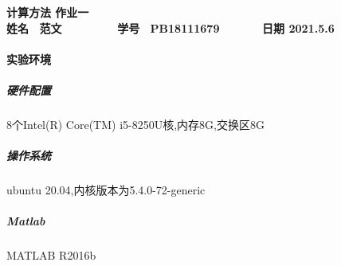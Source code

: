 \documentclass[12pt,a4paper,utf8]{ctexart}
\begin{document}


\begin{center}
\textbf{计算方法 作业一}\\
\textbf{姓名 ~范文~~~~~~~~ 学号 ~PB18111679~~~~~~ 日期 2021.5.6}\\
\end{center}

\begin{center}
\fbox{
\begin{minipage}{40em}
\vspace{5cm}
\hspace{20cm}
\end{minipage}}
\end{center}
\vspace{1cm}

\paragraph{实验环境}
\subparagraph{硬件配置}
        8个Intel(R) Core(TM) i5-8250U核,内存8G,交换区8G
\subparagraph{操作系统}
        ubuntu 20.04,内核版本为5.4.0-72-generic
\subparagraph{Matlab}
        MATLAB R2016b 
\end{document}
